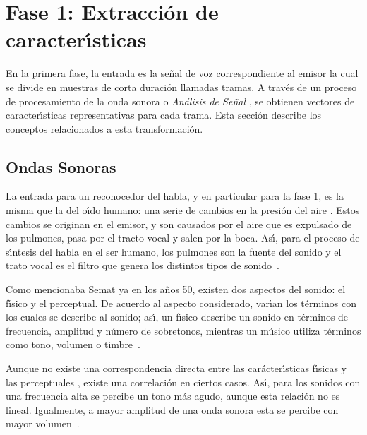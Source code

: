 \section{Fase 1: Extracci\'on de caracter{\'\i}sticas}
\label{sec:featureExtraction}

En la primera fase, la entrada es la se\~nal de voz correspondiente al emisor la cual se divide en muestras
de corta duraci\'on llamadas tramas. A trav\'es de un proceso de procesamiento de la onda sonora o 
\emph{An\'alisis de Se\~nal} \cite{Jurafsky}, se obtienen vectores de caracter{\'\i}sticas representativas 
para cada trama. Esta secci\'on describe los conceptos relacionados a esta transformaci\'on.

\subsection{Ondas Sonoras}

La entrada para un reconocedor del habla, y en particular para la fase 1, es la misma que la del o{\'\i}do humano: una 
serie de cambios en la presi\'on del aire \cite{YoungUniversity2007}. Estos cambios se originan en el emisor, y son 
causados por el aire que es expulsado de los pulmones, pasa por el tracto vocal y salen por la boca. As{\'\i}, para el 
proceso de s{\'\i}ntesis del habla en el ser humano, los pulmones son la fuente
del sonido y el trato vocal es el filtro que genera los distintos tipos de \mbox{sonido \cite{BradburyLineal2000}}.

Como mencionaba Semat ya en los a\~nos 50, existen dos aspectos del sonido: el f{\'\i}sico y el perceptual. De acuerdo al 
aspecto considerado, var{\'\i}an los t\'erminos con los cuales se describe al sonido; as{\'\i}, un f{\'\i}sico describe un 
sonido en t\'erminos de frecuencia, amplitud y n\'umero de sobretonos, mientras un m\'usico utiliza t\'erminos como tono, 
volumen o \mbox{timbre \cite{SematPhysics1958}}.

Aunque no existe una correspondencia directa entre las car\'acter{\'\i}sticas f{\'\i}sicas y las perceptuales 
\cite{SematPhysics1958}, existe una correlaci\'on en ciertos casos. As{\'\i}, para los sonidos con una frecuencia alta se 
percibe un tono m\'as agudo, aunque esta relaci\'on no es lineal. Igualmente, a mayor amplitud de una onda sonora esta se 
percibe con mayor \mbox{volumen \cite{YoungUniversity2007}}.

